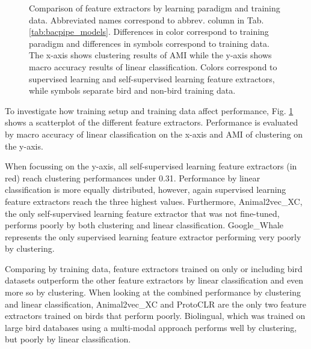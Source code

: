 \begin{figure}[ht]
    \centerline{}
        \caption{Comparison of feature extractors by learning paradigm and training data. Abbreviated names correspond to abbrev. column in Tab. \ref{tab:bacpipe_models}. Differences in color correspond to training paradigm and differences in symbols correspond to training data. The x-axis shows clustering results of AMI while the y-axis shows macro accuracy results of linear classification. Colors correspond to supervised learning and self-supervised learning feature extractors, while symbols separate bird and non-bird training data.}
        \label{fig:subl_vs_ssl}
    \end{figure}
    
To investigate how training setup and training data affect performance, Fig. \ref{fig:subl_vs_ssl} shows a scatterplot of the different feature extractors.
Performance is evaluated by macro accuracy of linear classification on the x-axis and AMI of clustering on the y-axis.

When focussing on the y-axis, all self-supervised learning feature extractors (in red) reach clustering performances under 0.31.
Performance by linear classification is more equally distributed, however, again supervised learning feature extractors reach the three highest values.
Furthermore, Animal2vec\_XC, the only self-supervised learning feature extractor that was not fine-tuned, performs poorly by both clustering and linear classification.
Google\_Whale represents the only supervised learning feature extractor performing very poorly by clustering.

Comparing by training data, feature extractors trained on only or including bird datasets outperform the other feature extractors by linear classification and even more so by clustering.
When looking at the combined performance by clustering and linear classification, Animal2vec\_XC and ProtoCLR are the only two feature extractors trained on birds that perform poorly.
Biolingual, which was trained on large bird databases using a multi-modal approach performs well by clustering, but poorly by linear classification.

